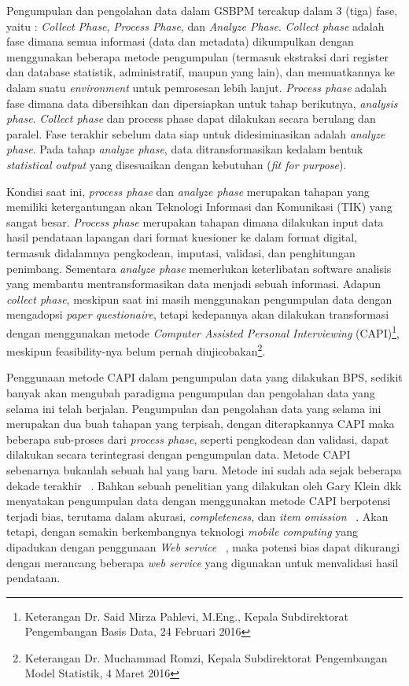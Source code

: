 Pengumpulan dan pengolahan data dalam GSBPM tercakup dalam 3 (tiga) fase, yaitu : \textit{Collect Phase}, \textit{Process Phase}, dan \textit{Analyze Phase}. \textit{Collect phase} adalah fase dimana semua informasi (data dan metadata) dikumpulkan dengan menggunakan beberapa metode pengumpulan (termasuk ekstraksi dari register dan database statistik, administratif, maupun yang lain), dan memuatkannya ke dalam suatu \textit{environment} untuk pemrosesan lebih lanjut. \textit{Process phase} adalah fase dimana data dibersihkan dan dipersiapkan untuk tahap berikutnya, \textit{analysis phase}. \textit{Collect phase} dan process phase dapat dilakukan secara berulang dan paralel. Fase terakhir sebelum data siap untuk didesiminasikan adalah \textit{analyze phase}. Pada tahap \textit{analyze phase}, data ditransformasikan kedalam bentuk \textit{statistical output} yang disesuaikan dengan kebutuhan (\textit{fit for purpose}).

Kondisi saat ini, \textit{process phase} dan \textit{analyze phase} merupakan tahapan yang memiliki ketergantungan akan Teknologi Informasi dan Komunikasi (TIK) yang sangat besar. \textit{Process phase} merupakan tahapan dimana dilakukan input data hasil pendataan lapangan dari format kuesioner ke dalam format digital, termasuk didalamnya pengkodean, imputasi, validasi, dan penghitungan penimbang. Sementara \textit{analyze phase} memerlukan keterlibatan software analisis yang membantu mentransformasikan data menjadi sebuah informasi. Adapun \textit{collect phase}, meskipun saat ini masih menggunakan pengumpulan data dengan mengadopsi \textit{paper questionaire}, tetapi kedepannya akan dilakukan transformasi dengan menggunakan metode \textit{Computer Assisted Personal Interviewing} (CAPI)\footnote{Keterangan Dr. Said Mirza Pahlevi, M.Eng., Kepala Subdirektorat Pengembangan Basis Data, 24 Februari 2016}, meskipun feasibility-nya belum pernah diujicobakan\footnote{Keterangan Dr. Muchammad Romzi, Kepala Subdirektorat Pengembangan Model Statistik, 4 Maret 2016}. 

Penggunaan metode CAPI dalam pengumpulan data yang dilakukan BPS, sedikit banyak akan mengubah paradigma pengumpulan dan pengolahan data yang selama ini telah berjalan. Pengumpulan dan pengolahan data yang selama ini merupakan dua buah tahapan yang terpisah, dengan diterapkannya CAPI maka beberapa sub-proses dari \textit{process phase}, seperti pengkodean dan validasi, dapat dilakukan secara terintegrasi dengan pengumpulan data. Metode CAPI sebenarnya bukanlah sebuah hal yang baru. Metode ini sudah ada sejak beberapa dekade terakhir ~\cite{_redesigning_????}. Bahkan sebuah penelitian yang dilakukan oleh Gary Klein dkk menyatakan pengumpulan data dengan menggunakan metode CAPI berpotensi terjadi bias, terutama dalam akurasi, \textit{completeness}, dan \textit{item omission} ~\cite{klein_bias_1996}. Akan tetapi, dengan semakin berkembangnya teknologi \textit{mobile computing} yang dipadukan dengan penggunaan \textit{Web service} ~\cite{tergujeff_mobile_2007}, maka potensi bias dapat dikurangi dengan merancang beberapa \textit{web service} yang digunakan untuk menvalidasi hasil pendataan.

